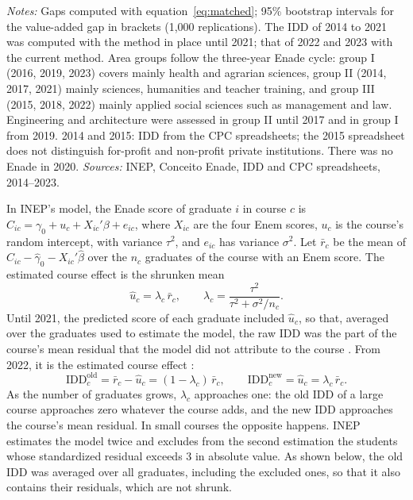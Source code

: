 \documentclass[11pt,a4paper]{article}
\begin{document}
\begin{table}[H]
\centering\small
\caption{Federal minus private courses of the same area, every Enade edition with course-level IDD}\label{tab:series}
\resizebox{\linewidth}{!}{}
\begin{minipage}{\linewidth}\vspace{0.4em}\scriptsize
\textit{Notes:} Gaps computed with equation~\eqref{eq:matched}; 95\% bootstrap intervals for the value-added gap in brackets (1,000 replications). The IDD of 2014 to 2021 was computed with the method in place until 2021; that of 2022 and 2023 with the current method. Area groups follow the three-year Enade cycle: group I (2016, 2019, 2023) covers mainly health and agrarian sciences, group II (2014, 2017, 2021) mainly sciences, humanities and teacher training, and group III (2015, 2018, 2022) mainly applied social sciences such as management and law. Engineering and architecture were assessed in group II until 2017 and in group I from 2019. 2014 and 2015: IDD from the CPC spreadsheets; the 2015 spreadsheet does not distinguish for-profit and non-profit private institutions. There was no Enade in 2020. \textit{Sources:} INEP, Conceito Enade, IDD and CPC spreadsheets, 2014--2023.
\end{minipage}
\end{table}
In INEP's model, the Enade score of graduate $i$ in course $c$ is $C_{ic}=\gamma_0+u_c+X_{ic}'\beta+e_{ic}$, where $X_{ic}$ are the four Enem scores, $u_c$ is the course's random intercept, with variance $\tau^2$, and $e_{ic}$ has variance $\sigma^2$. Let $\bar r_c$ be the mean of $C_{ic}-\hat\gamma_0-X_{ic}'\hat\beta$ over the $n_c$ graduates of the course with an Enem score. The estimated course effect is the shrunken mean
\begin{equation}\label{eq:blup}
\hat u_c=\lambda_c\,\bar r_c,\qquad \lambda_c=\frac{\tau^2}{\tau^2+\sigma^2/n_c}.
\end{equation}
Until 2021, the predicted score of each graduate included $\hat u_c$, so that, averaged over the graduates used to estimate the model, the raw IDD was the part of the course's mean residual that the model did not attribute to the course \citep{terhaar2021}. From 2022, it is the estimated course effect \citep{inep2023idd}:
\begin{equation}\label{eq:idd}
\mathrm{IDD}^{\mathrm{old}}_c=\bar r_c-\hat u_c=(1-\lambda_c)\,\bar r_c,\qquad \mathrm{IDD}^{\mathrm{new}}_c=\hat u_c=\lambda_c\,\bar r_c .
\end{equation}
As the number of graduates grows, $\lambda_c$ approaches one: the old IDD of a large course approaches zero whatever the course adds, and the new IDD approaches the course's mean residual. In small courses the opposite happens. INEP estimates the model twice and excludes from the second estimation the students whose standardized residual exceeds 3 in absolute value. As shown below, the old IDD was averaged over all graduates, including the excluded ones, so that it also contains their residuals, which are not shrunk.
\end{document}
